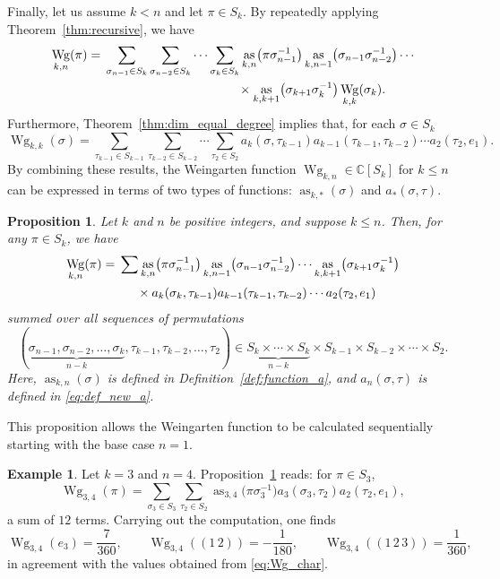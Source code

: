 \documentclass[10pt,a4paper]{amsart}
\numberwithin{equation}{section}
\newtheorem{Proposition}[Theorem]{Proposition}
\theoremstyle{definition}
\newtheorem{Example}[Theorem]{Example}
\DeclareMathOperator{\Raise}{as}
\DeclareMathOperator{\Wg}{Wg}
\begin{document}
Finally, let us assume $k<n$ and let $\pi \in S_k$.
By repeatedly applying Theorem~\ref{thm:recursive}, we have
\begin{align*}
\Wg_{k,n}(\pi)={}& \sum_{\sigma_{n-1} \in S_k} \sum_{\sigma_{n-2} \in S_k} \cdots \sum_{\sigma_{k} \in S_k}
\Raise_{k,n} \bigl(\pi\sigma_{n-1}^{-1}\bigr) \Raise_{k,n-1} \bigl(\sigma_{n-1}\sigma_{n-2}^{-1}\bigr) \cdots \\
& \hphantom{\sum_{\sigma_{n-1} \in S_k} \sum_{\sigma_{n-2} \in S_k} \cdots \sum_{\sigma_{k} \in S_k}}{}
 \times
\Raise_{k,k+1} \bigl(\sigma_{k+1}\sigma_{k}^{-1}\bigr) \Wg_{k,k} (\sigma_{k}).
\end{align*}
Furthermore, Theorem~\ref{thm:dim_equal_degree} implies that, for each $\sigma \in S_{k}$
\[
\Wg_{k,k}(\sigma) = \sum_{\tau_{k-1} \in S_{k-1}}
\sum_{\tau_{k-2} \in S_{k-2}} \cdots \sum_{\tau_{2} \in S_2}
a_k(\sigma, \tau_{k-1}) a_{k-1}(\tau_{k-1}, \tau_{k-2}) \cdots a_2(\tau_{2}, e_1).
\]
By combining these results, the Weingarten function $\Wg_{k,n} \in \mathbb{C}[S_k]$ for $k \le n$ can be expressed in terms of two types of functions: $\Raise_{k,*}(\sigma)$ and $a_*(\sigma,\tau)$.

\begin{Proposition} \label{prop:Wg_asasas}
Let $k$ and $n$ be positive integers, and suppose $k \le n$.
Then, for any $\pi \in S_k$, we have
\begin{align*}
\Wg_{k,n}(\pi)={}& \sum \Raise_{k,n} \bigl(\pi\sigma_{n-1}^{-1}\bigr) \Raise_{k,n-1} \bigl(\sigma_{n-1} \sigma_{n-2}^{-1}\bigr) \cdots \Raise_{k,k+1} \bigl(\sigma_{k+1}\sigma_{k}^{-1}\bigr) \\
& \hphantom{\sum}{} \times a_k(\sigma_k, \tau_{k-1}) a_{k-1}(\tau_{k-1}, \tau_{k-2}) \cdots a_2(\tau_{2}, e_1)
\end{align*}
summed over all sequences of permutations
\[
(\underbrace{\sigma_{n-1}, \sigma_{n-2}, \dots, \sigma_{k}}_{n-k}, \tau_{k-1},\tau_{k-2},\dots, \tau_2) \in \underbrace{S_k \times \cdots \times S_k}_{n-k} \times S_{k-1} \times S_{k-2} \times \cdots \times S_2.
\]
Here, $\Raise_{k,n}(\sigma)$ is defined in Definition~{\rm \ref{def:function_a}}, and $a_n
(\sigma,\tau)$ is defined in \eqref{eq:def_new_a}.
\end{Proposition}

This proposition allows the Weingarten function to be calculated sequentially starting with the base case $n=1$.

%
\begin{Example}
Let $k=3$ and $n=4$. Proposition~\ref{prop:Wg_asasas} reads: for $\pi \in S_3$,
\[
\Wg_{3,4}(\pi) = \sum_{\sigma_3 \in S_3} \sum_{\tau_2 \in S_2}
\Raise_{3,4}\bigl(\pi \sigma_3^{-1}\bigr) a_3(\sigma_3,\tau_2) a_2(\tau_2, e_1),
\]
a sum of $12$ terms. Carrying out the computation, one finds
\[
\Wg_{3,4}(e_3)=\frac{7}{360}, \qquad
\Wg_{3,4}((1\,2))=-\frac{1}{180}, \qquad
\Wg_{3,4}((1\,2\,3))=\frac{1}{360},
\]
in agreement with the values obtained from \eqref{eq:Wg_char}.
\end{Example}
\end{document}
